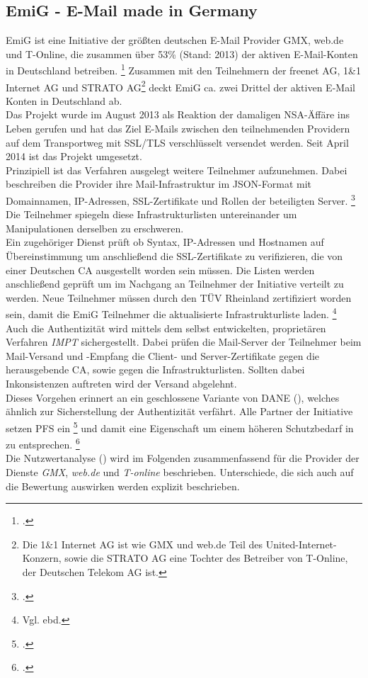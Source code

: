 \documentclass  [paper=a4,
				fontsize=12pt,
				listof=totoc,
				bibliography=totoc
				]{scrreprt}
\begin{document}
			\subsection{EmiG - E-Mail made in Germany}
			EmiG ist eine Initiative der größten deutschen E-Mail Provider GMX, web.de und T-Online, die zusammen über 53\% (Stand: 2013) der aktiven E-Mail-Konten in Deutschland betreiben.
			\footcite[Vgl.][]{Brandt13} 
			Zusammen mit den Teilnehmern der freenet AG, 1\&1 Internet AG und STRATO AG\footnote{Die 1\&1 Internet AG ist wie GMX und web.de Teil des United-Internet-Konzern, sowie die STRATO AG eine Tochter des Betreiber von T-Online, der Deutschen Telekom AG ist.} deckt EmiG ca. zwei Drittel der aktiven E-Mail Konten in Deutschland ab.\\
			Das Projekt wurde im August 2013 als Reaktion der damaligen NSA-Äffäre ins Leben gerufen und hat das Ziel E-Mails zwischen den teilnehmenden Providern auf dem Transportweg mit SSL/TLS verschlüsselt versendet werden.
			Seit April 2014 ist das Projekt umgesetzt.
			\medskip\\
			Prinzipiell ist das Verfahren ausgelegt weitere Teilnehmer aufzunehmen.
			Dabei beschreiben die Provider ihre Mail-Infrastruktur im JSON-Format mit \glqq Domainnamen, IP-Adressen, SSL-Zertifikate und Rollen der beteiligten Server.\grqq
			\footcite[Vgl.][]{Zivadino14-1}
			Die Teilnehmer spiegeln diese Infrastrukturlisten untereinander um Manipulationen derselben zu erschweren.\\
			Ein zugehöriger Dienst prüft ob Syntax, IP-Adressen und Hostnamen auf Übereinstimmung um anschließend die SSL-Zertifikate zu verifizieren, die von einer Deutschen CA ausgestellt worden sein müssen.
			Die Listen werden anschließend geprüft um im Nachgang an Teilnehmer der Initiative verteilt zu werden. 
			Neue Teilnehmer müssen durch den TÜV Rheinland zertifiziert worden sein, damit die EmiG Teilnehmer die aktualisierte Infrastrukturliste laden.
			\footnote{Vgl. ebd.}
			\medskip\\
			Auch die Authentizität wird mittels dem selbst entwickelten, proprietären Verfahren \textit{\ac{IMPT}} sichergestellt. 
			Dabei prüfen die Mail-Server der Teilnehmer beim Mail-Versand und -Empfang die Client- und Server-Zertifikate gegen die herausgebende CA, sowie gegen die Infrastrukturlisten.
			Sollten dabei Inkonsistenzen auftreten wird der Versand abgelehnt.\\
			Dieses Vorgehen erinnert an ein geschlossene Variante von \ac{DANE} (), welches ähnlich zur Sicherstellung der Authentizität verfährt.
			Alle Partner der Initiative setzen \ac{PFS} ein
			\footcite[Vgl.][]{Zivadino14-1}
			und damit eine Eigenschaft um einem höheren Schutzbedarf in zu entsprechen.
			\footcite[Vgl.][]{Zivadino14-2} 
			\medskip\\
			Die Nutzwertanalyse () wird im Folgenden zusammenfassend für die Provider der Dienste \textit{GMX}, \textit{web.de} und \textit{T-online} beschrieben. 
			Unterschiede, die sich auch auf die Bewertung auswirken werden explizit beschrieben.
			\pagebreak
\end{document}

